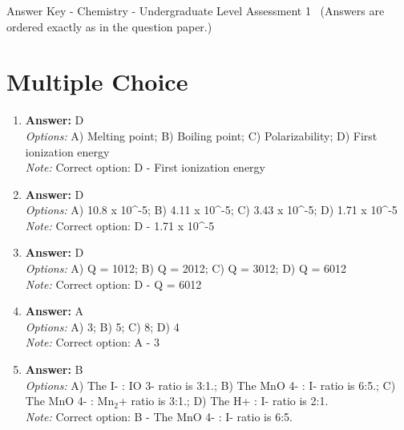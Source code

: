 \documentclass[12pt]{article}
\begin{document}
\begin{center}
Answer Key - Chemistry - Undergraduate Level Assessment 1 \
\small (Answers are ordered exactly as in the question paper.)
\end{center}

\section*{Multiple Choice}
\begin{enumerate}[label=\arabic*.]
\item \textbf{Answer:} D
\\ \textit{Options:} A) Melting point; B) Boiling point; C) Polarizability; D) First ionization energy
\\ \textit{Note:} Correct option: D - First ionization energy
\item \textbf{Answer:} D
\\ \textit{Options:} A) 10.8 x 10^-5; B) 4.11 x 10^-5; C) 3.43 x 10^-5; D) 1.71 x 10^-5
\\ \textit{Note:} Correct option: D - 1.71 x 10^-5
\item \textbf{Answer:} D
\\ \textit{Options:} A) Q = 1012; B) Q = 2012; C) Q = 3012; D) Q = 6012
\\ \textit{Note:} Correct option: D - Q = 6012
\item \textbf{Answer:} A
\\ \textit{Options:} A) 3; B) 5; C) 8; D) 4
\\ \textit{Note:} Correct option: A - 3
\item \textbf{Answer:} B
\\ \textit{Options:} A) The I- : IO 3- ratio is 3:1.; B) The MnO 4- : I- ratio is 6:5.; C) The MnO 4- : Mn$_{2}$+ ratio is 3:1.; D) The H+ : I- ratio is 2:1.
\\ \textit{Note:} Correct option: B - The MnO 4- : I- ratio is 6:5.
\end{enumerate}
\end{document}
